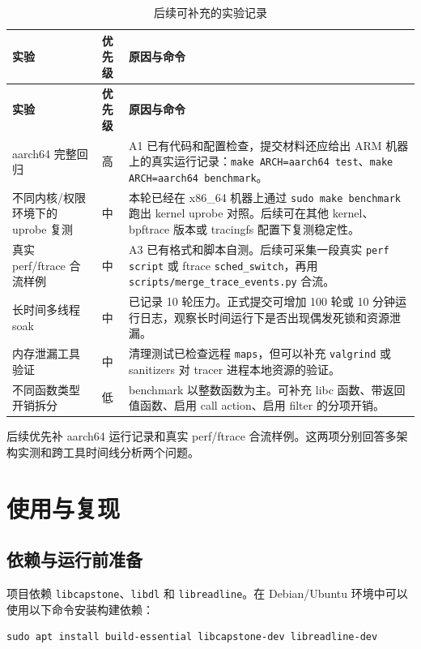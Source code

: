 \documentclass[UTF8,a4paper,11pt,fontset=fandol]{ctexart}
\newcommand{\code}[1]{\texttt{#1}}
\begin{document}
\begin{longtable}{@{}P{4.3cm}P{2.4cm}P{8.45cm}@{}}
\caption{后续可补充的实验记录}\label{tab:missing-experiments}\\
\toprule
\textbf{实验} & \textbf{优先级} & \textbf{原因与命令}\\
\midrule
\endfirsthead
\toprule
\textbf{实验} & \textbf{优先级} & \textbf{原因与命令}\\
\midrule
\endhead
aarch64 完整回归 & 高 & A1 已有代码和配置检查，提交材料还应给出 ARM 机器上的真实运行记录：\code{make ARCH=aarch64 test}、\code{make ARCH=aarch64 benchmark}。\\
不同内核/权限环境下的 uprobe 复测 & 中 & 本轮已经在 x86\_64 机器上通过 \code{sudo make benchmark} 跑出 kernel uprobe 对照。后续可在其他 kernel、bpftrace 版本或 tracingfs 配置下复测稳定性。\\
真实 perf/ftrace 合流样例 & 中 & A3 已有格式和脚本自测。后续可采集一段真实 \code{perf script} 或 ftrace \code{sched\_switch}，再用 \code{scripts/merge\_trace\_events.py} 合流。\\
长时间多线程 soak & 中 & 已记录 10 轮压力。正式提交可增加 100 轮或 10 分钟运行日志，观察长时间运行下是否出现偶发死锁和资源泄漏。\\
内存泄漏工具验证 & 中 & 清理测试已检查远程 \code{maps}，但可以补充 \code{valgrind} 或 sanitizers 对 tracer 进程本地资源的验证。\\
不同函数类型开销拆分 & 低 & benchmark 以整数函数为主。可补充 libc 函数、带返回值函数、启用 call action、启用 filter 的分项开销。\\
\bottomrule
\end{longtable}

后续优先补 aarch64 运行记录和真实 perf/ftrace 合流样例。这两项分别回答多架构实测和跨工具时间线分析两个问题。

\section{使用与复现}

\subsection{依赖与运行前准备}

项目依赖 \code{libcapstone}、\code{libdl} 和 \code{libreadline}。在 Debian/Ubuntu 环境中可以使用以下命令安装构建依赖：

\begin{lstlisting}
sudo apt install build-essential libcapstone-dev libreadline-dev
\end{lstlisting}
\end{document}
